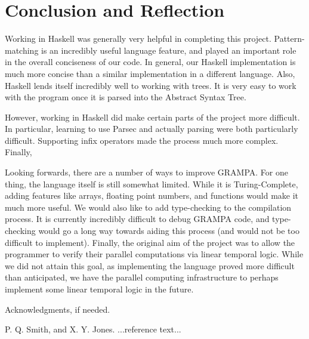 \documentclass[preprint]{sigplanconf}
\begin{document}
\section{Conclusion and Reflection}

Working in Haskell was generally very helpful in completing this project. Pattern-matching is an incredibly useful language feature, and played an important role in the overall conciseness of our code. In general, our Haskell implementation is much more concise than a similar implementation in a different language. Also, Haskell lends itself incredibly well to working with trees. It is very easy to work with the program once it is parsed into the Abstract Syntax Tree. 

However, working in Haskell did make certain parts of the project more difficult. In particular, learning to use Parsec and actually parsing were both particularly difficult. Supporting infix operators made the process much more complex. Finally, 

Looking forwards, there are a number of ways to improve GRAMPA. For one thing, the language itself is still somewhat limited. While it is Turing-Complete, adding features like arrays, floating point numbers, and functions would make it much more useful. We would also like to add type-checking to the compilation process. It is currently incredibly difficult to debug GRAMPA code, and type-checking would go a long way towards aiding this process (and would not be too difficult to implement). Finally, the original aim of the project was to allow the programmer to verify their parallel computations via linear temporal logic. While we did not attain this goal, as implementing the language proved more difficult than anticipated, we have the parallel computing infrastructure to perhaps implement some linear temporal logic in the future. 

\acks

Acknowledgments, if needed.





\begin{thebibliography}{}
\softraggedright

P. Q. Smith, and X. Y. Jones. ...reference text...

\end{thebibliography}
\end{document}
